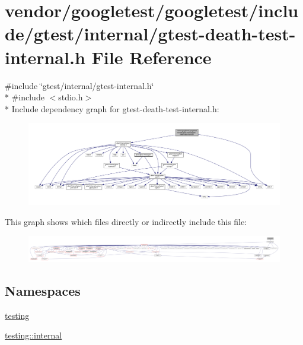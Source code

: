 \hypertarget{gtest-death-test-internal_8h}{}\section{vendor/googletest/googletest/include/gtest/internal/gtest-\/death-\/test-\/internal.h File Reference}
\label{gtest-death-test-internal_8h}
{\ttfamily \#include \char`\"{}gtest/internal/gtest-\/internal.\+h\char`\"{}}\\*
{\ttfamily \#include $<$stdio.\+h$>$}\\*
Include dependency graph for gtest-\/death-\/test-\/internal.h\+:\nopagebreak
\begin{figure}[H]
\begin{center}
\leavevmode
\includegraphics[width=350pt]{gtest-death-test-internal_8h__incl}
\end{center}
\end{figure}
This graph shows which files directly or indirectly include this file\+:\nopagebreak
\begin{figure}[H]
\begin{center}
\leavevmode
\includegraphics[width=350pt]{gtest-death-test-internal_8h__dep__incl}
\end{center}
\end{figure}
\subsection*{Namespaces}
\begin{DoxyCompactItemize}
\item 
 \hyperlink{namespacetesting}{testing}
\item 
 \hyperlink{namespacetesting_1_1internal}{testing\+::internal}
\end{DoxyCompactItemize}
